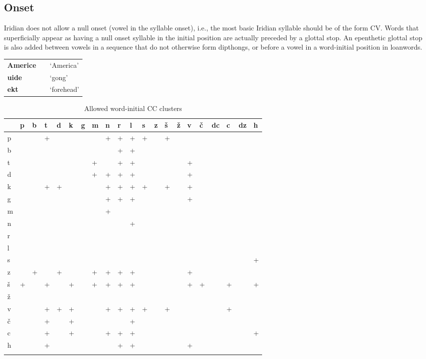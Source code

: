 \subsection{Onset}

\par Iridian does not allow a null onset (vowel in the syllable onset), i.e., the most basic Iridian syllable should be of the form CV. Words that superficially appear as having a null onset syllable in the initial position are actually preceded by a glottal stop. An epenthetic glottal stop is also added between vowels in a sequence that do not otherwise form dipthongs, or before a vowel in a word-initial position in loanwords.

\begin{center} \small
	\begin{tabularx}{0.8\textwidth}{>{\bfseries}YYY}
		Americe &  &`America'\\
		uide&& `gong'\\
		ekt&&`forehead'\\
	\end{tabularx}
\end{center}

\begin{table}[h!]
	\small \centering
	\caption{Allowed word-initial CC clusters}
	\begin{tabularx}{\textwidth}{YMMMMMMMMMMMMMMMMMMMM}
		\toprule
		&p&b&t&d&k&g&m&n&r&l&s&z&\v{s}&\v{z}&v&\v{c}&dc&c&dz&h\\
		\midrule
		p&&&+&&&&&+&+&+&+&&+&&&&&&&\\
		b&&&&&&&&&+&+&&&&&&&&&&\\
		t&&&&&&&+&&+&+&&&&&+&&&&&\\
		d&&&&&&&+&+&+&+&&&&&+&&&&&\\
		k&&&+&+&&&&+&+&+&+&&+&&+&&&&&\\
		g&&&&&&&&+&+&+&&&&&+&&&&&\\
		m&&&&&&&&+&&&&&&&&&&&&\\
		n&&&&&&&&&&+&&&&&&&&&&\\
		r&&&&&&&&&&&&&&&&&&&&\\
		l&&&&&&&&&&&&&&&&&&&&\\
		s&&&&&&&&&&&&&&&&&&&&+\\
		z&&+&&+&&&+&+&+&+&&&&&+&&&&&\\
		\v{s}&+&&+&&+&&+&+&+&+&&&&&+&+&&+&&+\\
		\v{z}&&&&&&&&&&&&&&&&&&&&\\
		v&&&+&+&+&&&+&+&+&+&&+&&&&&+&&\\
		\v{c}&&&+&&+&&&&&+&&&&&&&&&&\\
		c&&&+&&+&&&+&+&+&&&&&&&&&&+\\
		h&&&+&&&&&&+&+&&&&&+&&&&&\\
		\bottomrule
		\addlinespace
	\end{tabularx}
\end{table}

